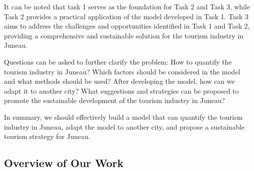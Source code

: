 It can be noted that task 1 serves as the foundation for Task 2 and Task 3, 
while Task 2 provides a practical application of the model developed in Task 1. 
Task 3 aims to address the challenges and opportunities identified in Task 1 and Task 2, 
providing a comprehensive and sustainable solution for the tourism industry in Juneau.

Questions can be asked to further clarify the problem:
How to quantify the tourism industry in Juneau? Which factors should be 
considered in the model and what methods should be used? After developing 
the model, how can we adapt it to another city? What suggestions and 
strategies can be proposed to promote the sustainable development of the
tourism industry in Juneau?

In summary, we should effectively build a model that can quantify the tourism
industry in Juneau, adapt the model to another city, and propose a sustainable
tourism strategy for Juneau.


\subsection{Overview of Our Work}